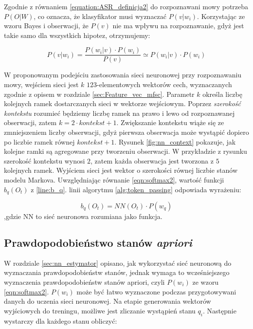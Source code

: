 \documentclass[11pt]{article}
\begin{document}
		Zgodnie z równaniem \ref{equation:ASR_definicja2} do rozpoznawani mowy potrzeba $P(O|W)$, co oznacza, że klasyfikator musi wyznaczać $P(v|w_i)$. Korzystając ze wzoru Bayes i obserwacji, że $P(v)$ nie ma wpływu na rozpoznawanie, gdyż jest takie samo dla wszystkich hipotez, otrzymujemy:
		
		\begin{equation}
			P(v|w_i) = \frac{P(w_i|v) \cdot P(w_i)}{P(v)}\simeq P(w_i|v) \cdot P(w_i)
			\label{eqn:softmax2}
		\end{equation}
		
		 W proponowanym podejściu zastosowania sieci neuronowej przy rozpoznawaniu mowy, wejściem sieci jest $k$ $123$-elementowych wektorów cech, wyznaczanych zgodnie z opisem w rozdziale \ref{sec:Feature_vec_mfsc}. Parametr $k$ określa liczbę kolejnych ramek dostarczanych sieci w wektorze wejściowym. Poprzez \textit{szerokość kontekstu} rozumieć będziemy liczbę ramek na prawo i lewo od rozpoznawanej obserwacji, zatem $k = 2 \cdot kontekst + 1$. Zwiększanie kontekstu wiąże się ze zmniejszeniem liczby obserwacji, gdyż pierwsza obserwacja może wystąpić dopiero po liczbie ramek równej $kontekst + 1$. Rysunek \ref{fig:nn_context} pokazuje, jak kolejne ramki są agregowane przy tworzeniu obserwacji. W przykładzie z rysunku szerokość kontekstu wynosi $2$, zatem każda obserwacja jest tworzona z $5$ kolejnych ramek. Wyjściem sieci jest wektor o szerokości równej liczbie stanów modelu Markova. Uwzględniając równanie \ref{eqn:softmax2}, wartość funkcji $b_q(O_t)$ z \ref{line:b_q}. linii algorytmu \ref{alg:token_passing} odpowiada wyrażeniu:
		 
		 \begin{equation}
			 b_q(O_t) = NN(O_t) \cdot P(w_q)			 
		 \end{equation}
		 ,gdzie NN to sieć neuronowa rozumiana jako funkcja.
		
	\subsection{Prawdopodobieństwo stanów \textit{apriori} }
		W rozdziale \ref{sec:nn_estymator} opisano, jak wykorzystać sieć neuronową do wyznaczania prawdopodobieństw stanów, jednak wymaga to wcześniejszego wyznaczenia prawdopodobieństw stanów apriori, czyli $P(w_i)$ ze wzoru \ref{eqn:softmax2}. 
		$P(w_i)$ może być łatwo wyznaczone podczas przygotowywani danych do uczenia sieci neuronowej. Na etapie generowania wektorów wyjściowych do treningu, możliwe jest zliczanie wystąpień stanu $q_i$.
		Następnie wystarczy dla każdego stanu obliczyć:
		
\end{document}
